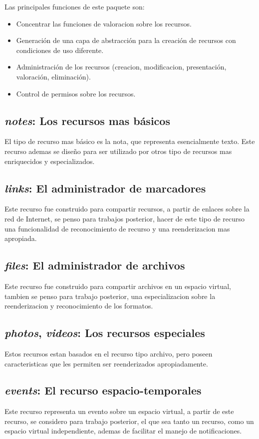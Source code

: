 Las principales funciones de este paquete son:

\begin{itemize}
\item Concentrar las funciones de valoracion sobre los recursos.
\item Generación de una capa de abstracción para la creación de recursos con
condiciones de uso diferente.
\item Administración de los recursos (creacion, modificacion, presentación,
valoración, eliminación).
\item Control de permisos sobre los recursos.
\end{itemize}

\subsection{\emph{notes}: Los recursos mas básicos}
El tipo de recurso mas básico es la nota, que representa esencialmente texto.
Este recurso ademas se diseño para ser utilizado por otros tipo de recursos mas
enriquecidos y especializados.

\subsection{\emph{links}: El administrador de marcadores}
Este recurso fue construido para compartir recursos, a partir de enlaces sobre
la red de Internet, se penso para trabajos posterior, hacer de este tipo de
recurso una funcionalidad de reconocimiento de recurso y una reenderizacion mas
apropiada.

\subsection{\emph{files}: El administrador de archivos}
Este recurso fue construido para compartir archivos en un espacio virtual,
tambien se penso para trabajo posterior, una especializacion sobre la
reenderizacion y reconocimiento de los formatos.

\subsection{\emph{photos}, \emph{videos}: Los recursos especiales}
Estos recursos estan basados en el recurso tipo archivo, pero poseen
caracteristicas que les permiten ser reenderizados apropiadamente.

\subsection{\emph{events}: El recurso espacio-temporales}
Este recurso representa un evento sobre un espacio virtual, a partir de este
recurso, se considero para trabajo posterior, el que sea tanto un recurso, como
un espacio virtual independiente, ademas de facilitar el manejo de
notificaciones.

